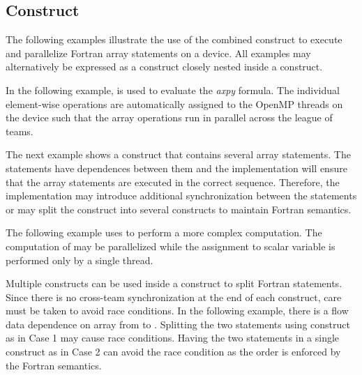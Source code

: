 \begin{fortranspecific}[4ex]
\section{ Construct}
\label{sec:target_teams_workdistribute}

The following examples illustrate the use of the combined  construct to execute and parallelize Fortran array statements on
a device.  All examples may alternatively be expressed as a 
construct closely nested inside a  construct.


In the following example,  is used to
evaluate the \emph{axpy} formula. The individual element-wise operations are
automatically assigned to the OpenMP threads on the device such that the
array operations run in parallel across the league of teams.


The next example shows a  construct that
contains several array statements. The statements have dependences between
them and the implementation will ensure that the array statements are executed
in the correct sequence. Therefore, the implementation may introduce additional
synchronization between the statements or may split the construct into several
 constructs to maintain Fortran semantics.


The following example uses  to perform a more
complex computation. The computation of  may be
parallelized while the assignment to scalar variable  is performed only by a
single thread.


Multiple  constructs can be used inside a 
construct to split Fortran statements.
Since there is no cross-team synchronization at the end of each
 construct, care must be taken to avoid race conditions.
In the following example, there is a flow data dependence on array
 from  to . Splitting the two statements
using  construct as in Case 1 may cause race conditions.
Having the two statements in a single  construct as 
in Case 2 can avoid the race condition as the order is enforced by 
the Fortran semantics.


\end{fortranspecific}
